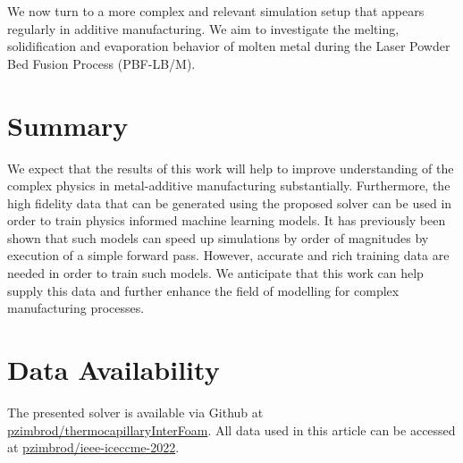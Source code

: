 \documentclass[conference,final]{IEEEtran}
\begin{document}
We now turn to a more complex and relevant simulation setup that appears regularly in additive manufacturing. We aim to investigate the melting, solidification and evaporation behavior of molten metal during the Laser Powder Bed Fusion Process (PBF-LB/M).

\section{Summary}

We expect that the results of this work will help to improve understanding of the complex physics in metal-additive manufacturing substantially. Furthermore, the high fidelity data that can be generated using the proposed solver can be used in order to train physics informed machine learning models. It has previously been shown that such models can speed up simulations by order of magnitudes by execution of a simple forward pass. However, accurate and rich training data are needed in order to train such models. We anticipate that this work can help supply this data and further enhance the field of modelling for complex manufacturing processes.

\section{Data Availability}

The presented solver is available via Github at \href{https://github.com/pzimbrod/thermocapillaryInterFoam}{pzimbrod/thermocapillaryInterFoam}. All data used in this article can be accessed at \href{https://github.com/pzimbrod/ieee-iceccme-2022}{pzimbrod/ieee-iceccme-2022}.



\end{document}
